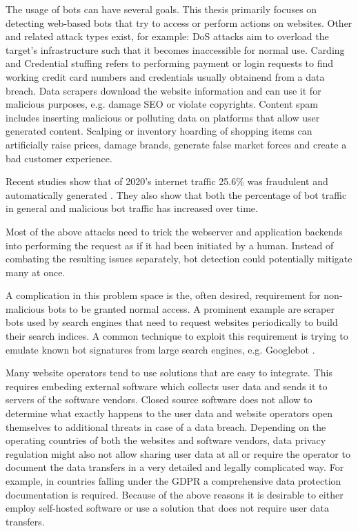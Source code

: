 \documentclass[
    fontsize=12pt,
    headings=small,
    parskip=half,           %
    bibliography=totoc,
    numbers=noenddot,       %
    open=any,               %
    final                   %
]{scrreprt}
\begin{document}
The usage of bots can have several goals. This thesis primarily focuses on detecting web-based bots that try to access or perform actions on websites. Other and related attack types exist, for example:
DoS attacks aim to overload the target's infrastructure such that it becomes inaccessible for normal use. Carding and Credential stuffing refers to performing payment or login requests to find working credit card numbers and credentials usually obtainend from a data breach. Data scrapers download the website information and can use it for malicious purposes, e.g. damage SEO or violate copyrights. Content spam includes inserting malicious or polluting data on platforms that allow user generated content. Scalping or inventory hoarding of shopping items can artificially raise prices, damage brands, generate false market forces and create a bad customer experience.

Recent studies show that of 2020's internet traffic 25.6\% was fraudulent and automatically generated \cite{BAD_BOT_REPORT2020} \cite{BAD_BOT_REPORT2021}. They also show that both the percentage of bot traffic in general and malicious bot traffic has increased over time.

Most of the above attacks need to trick the webserver and application backends into performing the request as if it had been initiated by a human. Instead of combating the resulting issues separately, bot detection could potentially mitigate many at once.

A complication in this problem space is the, often desired, requirement for non-malicious bots to be granted normal access. A prominent example are scraper bots used by search engines that need to request websites periodically to build their search indices. A common technique to exploit this requirement is trying to emulate known bot signatures from large search engines, e.g. Googlebot \cite{8421894}.

Many website operators tend to use solutions that are easy to integrate. This requires embeding external software which collects user data and sends it to servers of the software vendors. Closed source software does not allow to determine what exactly happens to the user data and website operators open themselves to additional threats in case of a data breach. Depending on the operating countries of both the websites and software vendors, data privacy regulation might also not allow sharing user data at all or require the operator to document the data transfers in a very detailed and legally complicated way. For example, in countries falling under the GDPR \cite{GDPR} a comprehensive data protection documentation is required. Because of the above reasons it is desirable to either employ self-hosted software or use a solution that does not require user data transfers.
\end{document}
